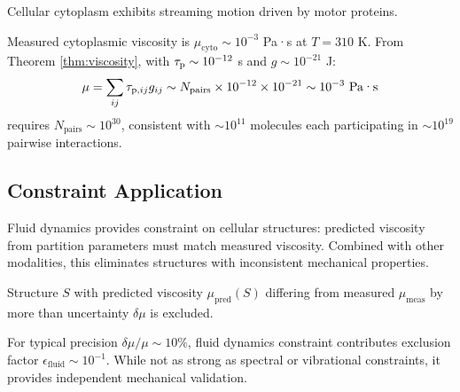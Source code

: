Cellular cytoplasm exhibits streaming motion driven by motor proteins.

\begin{example}
Measured cytoplasmic viscosity is $\mu_{\text{cyto}} \sim 10^{-3}$ Pa·s at $T = 310$ K. From Theorem \ref{thm:viscosity}, with $\tau_{\mathrm{p}} \sim 10^{-12}$ s and $g \sim 10^{-21}$ J:
\begin{equation}
\mu = \sum_{ij} \tau_{\mathrm{p},ij} g_{ij} \sim N_{\text{pairs}} \times 10^{-12} \times 10^{-21} \sim 10^{-3}\text{ Pa·s}
\end{equation}
requires $N_{\text{pairs}} \sim 10^{30}$, consistent with $\sim 10^{11}$ molecules each participating in $\sim 10^{19}$ pairwise interactions.
\end{example}

\subsection{Constraint Application}

Fluid dynamics provides constraint on cellular structures: predicted viscosity from partition parameters must match measured viscosity. Combined with other modalities, this eliminates structures with inconsistent mechanical properties.

\begin{theorem}
Structure $S$ with predicted viscosity $\mu_{\text{pred}}(S)$ differing from measured $\mu_{\text{meas}}$ by more than uncertainty $\delta\mu$ is excluded.
\end{theorem}

For typical precision $\delta\mu/\mu \sim 10\%$, fluid dynamics constraint contributes exclusion factor $\epsilon_{\text{fluid}} \sim 10^{-1}$. While not as strong as spectral or vibrational constraints, it provides independent mechanical validation.
